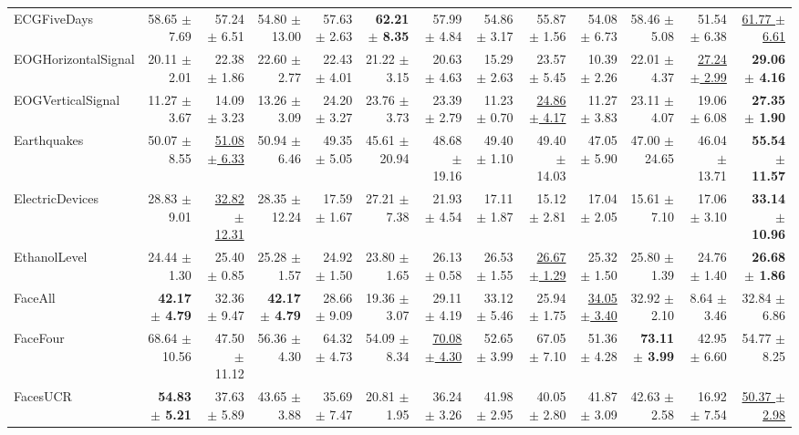 \begin{landscape}
\begin{longtable}{lrrrrrrrrrrrr}
ECGFiveDays & 58.65 $\pm$ 7.69 & 57.24 $\pm$ 6.51 & 54.80 $\pm$ 13.00 & 57.63 $\pm$ 2.63 & \textbf{62.21 $\pm$ 8.35} & 57.99 $\pm$ 4.84 & 54.86 $\pm$ 3.17 & 55.87 $\pm$ 1.56 & 54.08 $\pm$ 6.73 & 58.46 $\pm$ 5.08 & 51.54 $\pm$ 6.38 & \underline{61.77 $\pm$ 6.61} \\
EOGHorizontalSignal & 20.11 $\pm$ 2.01 & 22.38 $\pm$ 1.86 & 22.60 $\pm$ 2.77 & 22.43 $\pm$ 4.01 & 21.22 $\pm$ 3.15 & 20.63 $\pm$ 4.63 & 15.29 $\pm$ 2.63 & 23.57 $\pm$ 5.45 & 10.39 $\pm$ 2.26 & 22.01 $\pm$ 4.37 & \underline{27.24 $\pm$ 2.99} & \textbf{29.06 $\pm$ 4.16} \\
EOGVerticalSignal & 11.27 $\pm$ 3.67 & 14.09 $\pm$ 3.23 & 13.26 $\pm$ 3.09 & 24.20 $\pm$ 3.27 & 23.76 $\pm$ 3.73 & 23.39 $\pm$ 2.79 & 11.23 $\pm$ 0.70 & \underline{24.86 $\pm$ 4.17} & 11.27 $\pm$ 3.83 & 23.11 $\pm$ 4.07 & 19.06 $\pm$ 6.08 & \textbf{27.35 $\pm$ 1.90} \\
Earthquakes & 50.07 $\pm$ 8.55 & \underline{51.08 $\pm$ 6.33} & 50.94 $\pm$ 6.46 & 49.35 $\pm$ 5.05 & 45.61 $\pm$ 20.94 & 48.68 $\pm$ 19.16 & 49.40 $\pm$ 1.10 & 49.40 $\pm$ 14.03 & 47.05 $\pm$ 5.90 & 47.00 $\pm$ 24.65 & 46.04 $\pm$ 13.71 & \textbf{55.54 $\pm$ 11.57} \\
ElectricDevices & 28.83 $\pm$ 9.01 & \underline{32.82 $\pm$ 12.31} & 28.35 $\pm$ 12.24 & 17.59 $\pm$ 1.67 & 27.21 $\pm$ 7.38 & 21.93 $\pm$ 4.54 & 17.11 $\pm$ 1.87 & 15.12 $\pm$ 2.81 & 17.04 $\pm$ 2.05 & 15.61 $\pm$ 7.10 & 17.06 $\pm$ 3.10 & \textbf{33.14 $\pm$ 10.96} \\
EthanolLevel & 24.44 $\pm$ 1.30 & 25.40 $\pm$ 0.85 & 25.28 $\pm$ 1.57 & 24.92 $\pm$ 1.50 & 23.80 $\pm$ 1.65 & 26.13 $\pm$ 0.58 & 26.53 $\pm$ 1.55 & \underline{26.67 $\pm$ 1.29} & 25.32 $\pm$ 1.50 & 25.80 $\pm$ 1.39 & 24.76 $\pm$ 1.40 & \textbf{26.68 $\pm$ 1.86} \\
FaceAll & \textbf{42.17 $\pm$ 4.79} & 32.36 $\pm$ 9.47 & \textbf{42.17 $\pm$ 4.79} & 28.66 $\pm$ 9.09 & 19.36 $\pm$ 3.07 & 29.11 $\pm$ 4.19 & 33.12 $\pm$ 5.46 & 25.94 $\pm$ 1.75 & \underline{34.05 $\pm$ 3.40} & 32.92 $\pm$ 2.10 & 8.64 $\pm$ 3.46 & 32.84 $\pm$ 6.86 \\
FaceFour & 68.64 $\pm$ 10.56 & 47.50 $\pm$ 11.12 & 56.36 $\pm$ 4.30 & 64.32 $\pm$ 4.73 & 54.09 $\pm$ 8.34 & \underline{70.08 $\pm$ 4.30} & 52.65 $\pm$ 3.99 & 67.05 $\pm$ 7.10 & 51.36 $\pm$ 4.28 & \textbf{73.11 $\pm$ 3.99} & 42.95 $\pm$ 6.60 & 54.77 $\pm$ 8.25 \\
FacesUCR & \textbf{54.83 $\pm$ 5.21} & 37.63 $\pm$ 5.89 & 43.65 $\pm$ 3.88 & 35.69 $\pm$ 7.47 & 20.81 $\pm$ 1.95 & 36.24 $\pm$ 3.26 & 41.98 $\pm$ 2.95 & 40.05 $\pm$ 2.80 & 41.87 $\pm$ 3.09 & 42.63 $\pm$ 2.58 & 16.92 $\pm$ 7.54 & \underline{50.37 $\pm$ 2.98} \\

\end{longtable}
\end{landscape}
